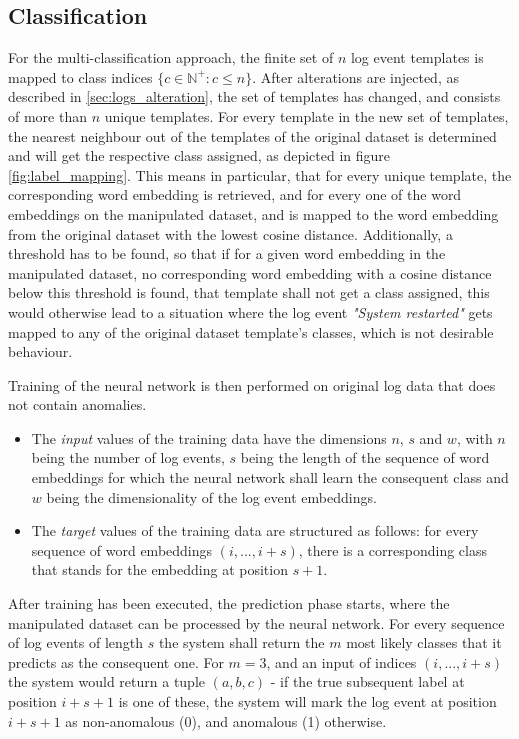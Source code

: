 \subsection{Classification \label{sec:classification}}
For the multi-classification approach, the finite set of $n$ log event templates is mapped to class indices $\{c \in \mathbb{N}^{+}: c \leq n\}$. After alterations are injected, as described in \ref{sec:logs_alteration}, the set of templates has changed, and consists of more than $n$ unique templates. For every template in the new set of templates, the nearest neighbour out of the templates of the original dataset is determined and will get the respective class assigned, as depicted in figure \ref{fig:label_mapping}. This means in particular, that for every unique template, the corresponding word embedding is retrieved, and for every one of the word embeddings on the manipulated dataset, and is mapped to the word embedding from the original dataset with the lowest cosine distance. Additionally, a threshold has to be found, so that if for a given word embedding in the manipulated dataset, no corresponding word embedding with a cosine distance below this threshold is found, that template shall not get a class assigned, this would otherwise lead to a situation where the log event \textit{"System restarted"} gets mapped to any of the original dataset template's classes, which is not desirable behaviour.

Training of the neural network is then performed on original log data that does not contain anomalies. 
\begin{itemize}
\setlength\itemsep{-0.5em}
	\item The \textit{input} values of the training data have the dimensions $n$, $s$ and $w$, with $n$ being the number of log events, $s$ being the length of the sequence of word embeddings for which the neural network shall learn the consequent class and $w$ being the dimensionality of the log event embeddings.
	\item The \textit{target} values of the training data are structured as follows: for every sequence of word embeddings $(i, ..., i+s)$, there is a corresponding class that stands for the embedding at position $s+1$.
\end{itemize}


 After training has been executed, the prediction phase starts, where the manipulated dataset can be processed by the neural network. For every sequence of log events of length $s$ the system shall return the $m$ most likely classes that it predicts as the consequent one. For $m=3$, and an input of indices $(i, ..., i+s)$ the system would return a tuple $(a,b,c)$ - if the true subsequent label at position $i+s+1$ is one of these, the system will mark the log event at position $i+s+1$ as non-anomalous (0), and anomalous (1) otherwise.
 

